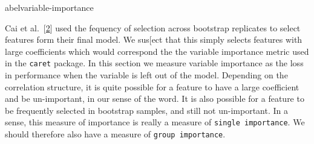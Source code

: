 \documentclass[
]{book}
\begin{document}
{abel{variable-importance}}

Cai et al.~{[}\protect\hyperlink{ref-Cai:2019aa}{2}{]} used the fequency of selection across
bootstrap replicates to select features form their final model.
We sus{[}ect that this simply selects features with large coefficients
which would correspond the the variable importance metric
used in the \texttt{caret} package. In this section we measure
variable importance as the loss in performance when the variable is left out
of the model. Depending on the correlation structure, it is quite possible
for a feature to have a large coefficient and be un-important, in our sense of the word.
It is also possible for a feature to be frequently selected in bootstrap samples, and
still not un-important. In a sense, this measure of importance is really a measure
of \texttt{single\ importance}. We should therefore also have a measure of \texttt{group\ importance}.
\end{document}
